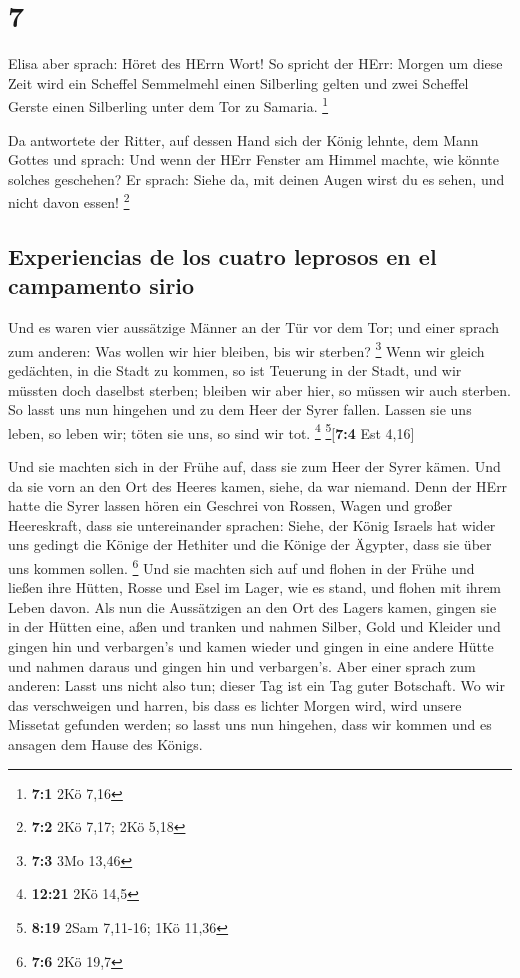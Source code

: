 \hypertarget{section-6}{%
\section{7}\label{section-6}}

 Elisa aber sprach: Höret des HErrn Wort! So spricht der
HErr: Morgen um diese Zeit wird ein Scheffel Semmelmehl einen Silberling
gelten und zwei Scheffel Gerste einen Silberling unter dem Tor zu
Samaria. \footnote{\textbf{7:1} 2Kö 7,16}

 Da antwortete der Ritter, auf dessen Hand sich der König
lehnte, dem Mann Gottes und sprach: Und wenn der HErr Fenster am Himmel
machte, wie könnte solches geschehen? Er sprach: Siehe da, mit deinen
Augen wirst du es sehen, und nicht davon essen! \footnote{\textbf{7:2}
  2Kö 7,17; 2Kö 5,18}

\hypertarget{experiencias-de-los-cuatro-leprosos-en-el-campamento-sirio}{%
\subsection{Experiencias de los cuatro leprosos en el campamento
sirio}\label{experiencias-de-los-cuatro-leprosos-en-el-campamento-sirio}}

 Und es waren vier aussätzige Männer an der Tür vor dem
Tor; und einer sprach zum anderen: Was wollen wir hier bleiben, bis wir
sterben? \footnote{\textbf{7:3} 3Mo 13,46}  Wenn wir
gleich gedächten, in die Stadt zu kommen, so ist Teuerung in der Stadt,
und wir müssten doch daselbst sterben; bleiben wir aber hier, so müssen
wir auch sterben. So lasst uns nun hingehen und zu dem Heer der Syrer
fallen. Lassen sie uns leben, so leben wir; töten sie uns, so sind wir
tot. \footnote{\textbf{12:21} 2Kö 14,5} \footnote{\textbf{8:19} 2Sam
  7,11-16; 1Kö 11,36}{[}\textbf{7:4} Est 4,16{]}

 Und sie machten sich in der Frühe auf, dass sie zum Heer
der Syrer kämen. Und da sie vorn an den Ort des Heeres kamen, siehe, da
war niemand.  Denn der HErr hatte die Syrer lassen hören
ein Geschrei von Rossen, Wagen und großer Heereskraft, dass sie
untereinander sprachen: Siehe, der König Israels hat wider uns gedingt
die Könige der Hethiter und die Könige der Ägypter, dass sie über uns
kommen sollen. \footnote{\textbf{7:6} 2Kö 19,7}  Und sie
machten sich auf und flohen in der Frühe und ließen ihre Hütten, Rosse
und Esel im Lager, wie es stand, und flohen mit ihrem Leben davon.
 Als nun die Aussätzigen an den Ort des Lagers kamen,
gingen sie in der Hütten eine, aßen und tranken und nahmen Silber, Gold
und Kleider und gingen hin und verbargen's und kamen wieder und gingen
in eine andere Hütte und nahmen daraus und gingen hin und verbargen's.
 Aber einer sprach zum anderen: Lasst uns nicht also tun;
dieser Tag ist ein Tag guter Botschaft. Wo wir das verschweigen und
harren, bis dass es lichter Morgen wird, wird unsere Missetat gefunden
werden; so lasst uns nun hingehen, dass wir kommen und es ansagen dem
Hause des Königs.

